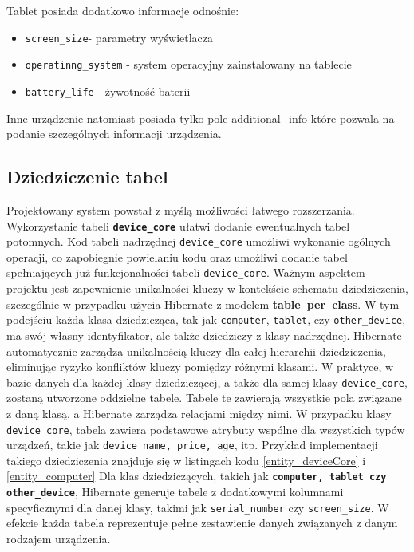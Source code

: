 Tablet posiada dodatkowo informacje odnośnie:
\begin{itemize}
	\item \texttt{screen\_size}- parametry wyświetlacza
	\item \texttt{operatinng\_system} - system operacyjny zainstalowany na tablecie
	\item \texttt{battery\_life} - żywotność baterii
\end{itemize}

Inne urządzenie natomiast posiada tylko pole additional\_info które pozwala na podanie szczególnych informacji urządzenia.

\subsection{Dziedziczenie tabel}
\label{dzedziczenie_hibernate:label}
Projektowany system powstał z myślą możliwości łatwego rozszerzania. Wykorzystanie tabeli \texttt{\textbf{device\_core}} ułatwi dodanie ewentualnych tabel potomnych. Kod tabeli nadrzędnej \texttt{device\_core} umożliwi wykonanie ogólnych operacji, co zapobiegnie powielaniu kodu oraz umożliwi dodanie tabel spełniających już funkcjonalności tabeli \texttt{device\_core}. Ważnym aspektem projektu jest zapewnienie unikalności kluczy w kontekście schematu dziedziczenia, szczególnie w przypadku użycia Hibernate z modelem {\textbf{table~per~class}}. W tym podejściu każda klasa dziedzicząca, tak jak \texttt{computer}, \texttt{tablet}, czy \texttt{other\_device}, ma swój własny identyfikator, ale także dziedziczy z klasy nadrzędnej. Hibernate automatycznie zarządza unikalnością kluczy dla całej hierarchii dziedziczenia, eliminując ryzyko konfliktów kluczy pomiędzy różnymi klasami. W praktyce, w bazie danych dla każdej klasy dziedziczącej, a także dla samej klasy \texttt{device\_core}, zostaną utworzone oddzielne tabele. Tabele te zawierają wszystkie pola związane z daną klasą, a Hibernate zarządza relacjami między nimi. W przypadku klasy \texttt{device\_core}, tabela zawiera podstawowe atrybuty wspólne dla wszystkich typów urządzeń, takie jak \texttt{device\_name, price, age}, itp. Przykład implementacji takiego dziedziczenia znajduje się w listingach kodu \ref{entity_deviceCore} i \ref{entity_computer}
\newline
Dla klas dziedziczących, takich jak \texttt{\textbf{computer, tablet czy other\_device}}, Hibernate generuje tabele z dodatkowymi kolumnami specyficznymi dla danej klasy, takimi jak \texttt{serial\_number} czy \texttt{screen\_size}. W efekcie każda tabela reprezentuje pełne zestawienie danych związanych z danym rodzajem urządzenia.


